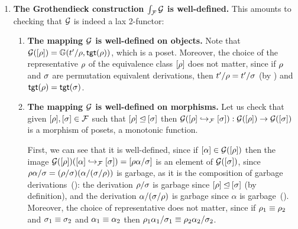 \begin{enumerate}
\item {\bf The Grothendieck construction $\int_{\mathcal{F}}{\mathcal{G}}$ is well-defined.}
  This amounts to checking that $\mathcal{G}$ is indeed a lax 2-functor:
  \begin{enumerate}
  \item {\bf The mapping $\mathcal{G}$ is well-defined on objects.}
    Note that $\mathcal{G}({[\rho]}) = \mathbb{G}(t'/\rho, \mathsf{tgt}(\rho))$, which is a poset.
    Moreover, the choice of the representative $\rho$ of the equivalence class ${[\rho]}$
    does not matter,
    since if $\rho$ and $\sigma$ are permutation equivalent derivations,
    then $t'/\rho = t'/\sigma$ (by )
    and $\mathsf{tgt}(\rho) = \mathsf{tgt}(\sigma)$.
  \item {\bf The mapping $\mathcal{G}$ is well-defined on morphisms.}
    Let us check that given ${[\rho]},{[\sigma]} \in \mathcal{F}$
    such that ${[\rho]} \unlhd {[\sigma]}$
    then
    $
      \mathcal{G}({[\rho]} \hookrightarrow_{\mathcal{F}} {[\sigma]}) : \mathcal{G}({[\rho]}) \to \mathcal{G}({[\sigma]})
    $ is a morphism of posets, \ie a monotonic function.

    First, we can see that it is well-defined,
    since if ${[\alpha]} \in \mathcal{G}([\rho])$
    then the image $\mathcal{G}({[\rho]})({[\alpha]} \hookrightarrow_{\mathcal{F}} {[\sigma]}) = {[\rho\alpha/\sigma]}$
    is an element of $\mathcal{G}([\sigma])$,
    since
    $
      \rho\alpha/\sigma = (\rho/\sigma)(\alpha/(\sigma/\rho))
    $
    is garbage, as it is the composition of garbage derivations~():
    the derivation $\rho/\sigma$ is garbage since ${[\rho]} \unlhd {[\sigma]}$ (by definition),
    and the derivation $\alpha/(\sigma/\rho)$ is garbage since $\alpha$ is garbage~().
    Moreover, the choice of representative does not matter,
    since if $\rho_1 \equiv \rho_2$ and $\sigma_1 \equiv \sigma_2$ and $\alpha_1 \equiv \alpha_2$
    then $\rho_1\alpha_1/\sigma_1 \equiv \rho_2\alpha_2/\sigma_2$.


\end{enumerate}
\end{enumerate}
